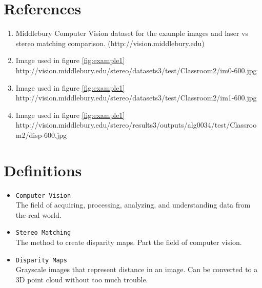 \documentclass[11pt,fleqn]{article}
\begin{document}
\begin{appendices}

\section{References}

\begin{enumerate}
\item Middlebury Computer Vision dataset for the example images and laser vs stereo matching comparison. (http://vision.middlebury.edu)
\item Image used in figure \ref{fig:example1}\\ http://vision.middlebury.edu/stereo/datasets3/test/Classroom2/im0-600.jpg
\item Image used in figure \ref{fig:example1}\\ http://vision.middlebury.edu/stereo/datasets3/test/Classroom2/im1-600.jpg
\item Image used in figure \ref{fig:example1}\\ http://vision.middlebury.edu/stereo/results3/outputs/alg0034/test/Classroom2/disp-600.jpg
\end{enumerate}


\section{Definitions}
\begin{itemize}
\item \texttt{Computer Vision}\\[2pt]
The field of acquiring, processing, analyzing, and understanding data from the real world.

\item \texttt{Stereo Matching}\\[2pt]
The method to create disparity maps. Part the field of computer vision.

\item \texttt{Disparity Maps}\\[2pt]
Grayscale images that represent distance in an image. Can be converted to a 3D point cloud without too much trouble.
\end{itemize}

\end{appendices}
\end{document}
